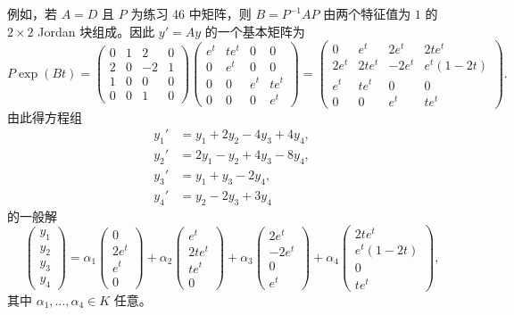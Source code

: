 \begin{enumerate}[label=\arabic*.]
例如，若 $A=D$ 且 $P$ 为练习 46 中矩阵，则 $B=P^{-1}AP$ 由两个特征值为 $1$ 的 $2\times2$ Jordan 块组成。因此 $y'=Ay$ 的一个基本矩阵为
\[
P\exp(Bt)=
\begin{pmatrix}
0&1&2&0\\
2&0&-2&1\\
1&0&0&0\\
0&0&1&0
\end{pmatrix}
\begin{pmatrix}
e^t&te^t&0&0\\
0&e^t&0&0\\
0&0&e^t&te^t\\
0&0&0&e^t
\end{pmatrix}
=
\begin{pmatrix}
0&e^t&2e^t&2te^t\\
2e^t&2te^t&-2e^t&e^t(1-2t)\\
e^t&te^t&0&0\\
0&0&e^t&te^t
\end{pmatrix}.
\]
由此得方程组
\[
\begin{aligned}
y_1'&=y_1+2y_2-4y_3+4y_4,\\
y_2'&=2y_1-y_2+4y_3-8y_4,\\
y_3'&=y_1+y_3-2y_4,\\
y_4'&=y_2-2y_3+3y_4
\end{aligned}
\]
的一般解
\[
\begin{pmatrix}y_1\\y_2\\y_3\\y_4\end{pmatrix}
=\alpha_1\begin{pmatrix}0\\2e^t\\e^t\\0\end{pmatrix}
+\alpha_2\begin{pmatrix}e^t\\2te^t\\te^t\\0\end{pmatrix}
+\alpha_3\begin{pmatrix}2e^t\\-2e^t\\0\\e^t\end{pmatrix}
+\alpha_4\begin{pmatrix}2te^t\\e^t(1-2t)\\0\\te^t\end{pmatrix},
\]
其中 $\alpha_1,
\ldots,
\alpha_4\in K$ 任意。


\end{enumerate}
